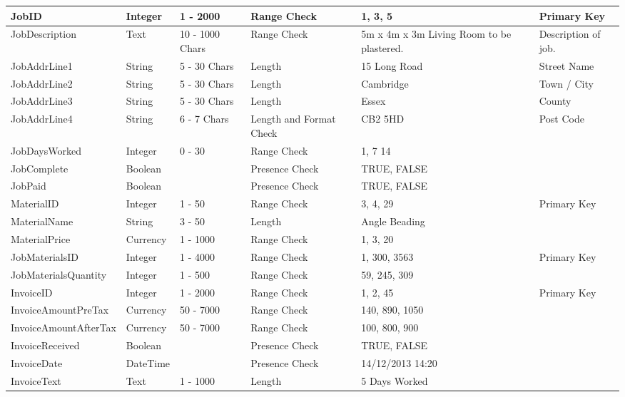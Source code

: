 \begin{flushleft}
\begin{longtable}{|p{4cm}|p{2cm}|p{2cm}|p{2cm}|p{2cm}|p{2cm}|}
JobID & Integer & 1 - 2000 & Range Check & 1, 3, 5 & Primary Key \\ \hline
JobDescription & Text & 10 - 1000 Chars & Range Check & 5m x 4m x 3m Living Room to be plastered. & Description of job. \\ \hline
JobAddrLine1 & String & 5 - 30 Chars & Length & 15 Long Road & Street Name \\ \hline
JobAddrLine2 & String & 5 - 30 Chars & Length & Cambridge & Town / City \\ \hline
JobAddrLine3 & String & 5 - 30 Chars & Length & Essex & County \\ \hline
JobAddrLine4 & String & 6 - 7 Chars & Length and Format Check & CB2 5HD & Post Code \\ \hline
JobDaysWorked & Integer & 0 - 30 & Range Check & 1, 7 14 &  \\ \hline
JobComplete & Boolean &  & Presence Check & TRUE, FALSE &  \\ \hline
JobPaid & Boolean &  & Presence Check & TRUE, FALSE &  \\ \hline \hline



MaterialID & Integer & 1 - 50 & Range Check & 3, 4, 29 & Primary Key \\ \hline
MaterialName & String & 3 - 50 & Length & Angle Beading &  \\ \hline  
MaterialPrice & Currency & 1 - 1000 & Range Check & 1, 3, 20 &  \\ \hline \hline


JobMaterialsID & Integer & 1 - 4000 & Range Check & 1, 300, 3563 & Primary Key \\ \hline
JobMaterialsQuantity & Integer & 1 - 500 & Range Check & 59, 245, 309 & \\ \hline \hline 


InvoiceID & Integer & 1 - 2000 & Range Check & 1, 2, 45 & Primary Key \\ \hline
InvoiceAmountPreTax & Currency & 50 - 7000 & Range Check & 140, 890, 1050 &  \\ \hline
InvoiceAmountAfterTax & Currency & 50 - 7000 & Range Check & 100, 800, 900 &  \\ \hline
InvoiceReceived & Boolean &  & Presence Check & TRUE, FALSE &  \\ \hline
InvoiceDate & DateTime &  & Presence Check & 14/12/2013 14:20 &  \\ \hline
InvoiceText & Text & 1 - 1000 & Length & 5 Days Worked &  \\ \hline \hline




\end{longtable}
\end{flushleft}
